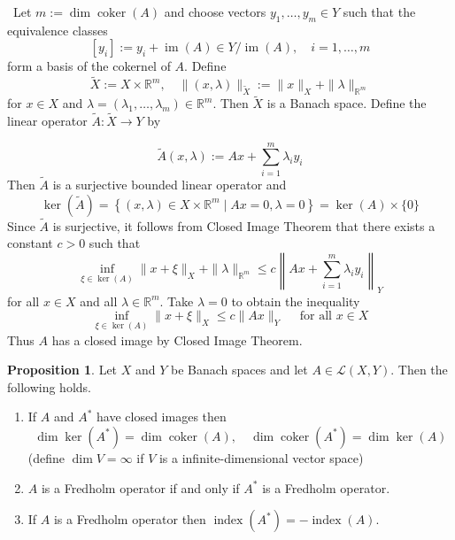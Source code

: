\documentclass[12pt,a4paper]{book}
\newenvironment{prooff}{{\noindent\it\textcolor{cyan!40!black}{Proof}:}\,}{\par}
\newenvironment{enu}{\begin{enumerate}[(1)]}{\end{enumerate}}
\theoremstyle{definition}
\newtheorem{prop}[defn]{Proposition}
\begin{document}
\begin{prooff}
    Let $m:=\operatorname{dim} \operatorname{coker}(A)$ and choose vectors $y_1, \ldots, y_m \in Y$ such that the equivalence classes
    $$
    \left[y_i\right]:=y_i+\operatorname{im}(A) \in Y / \operatorname{im}(A), \quad i=1, \ldots, m
    $$
    form a basis of the cokernel of $A$. Define
    $$
    \tilde{X}:=X \times \mathbb{R}^m, \quad\|(x, \lambda)\|_{\tilde{X}}:=\|x\|_X+\|\lambda\|_{\mathbb{R}^m}
    $$
    for $x \in X$ and $\lambda=\left(\lambda_1, \ldots, \lambda_m\right) \in \mathbb{R}^m$. Then $\tilde{X}$ is a Banach space. Define the linear operator $\widetilde{A}: \widetilde{X} \rightarrow Y$ by
    
    $$
    \widetilde{A}(x, \lambda):=A x+\sum_{i=1}^m \lambda_i y_i
    $$
    Then $\widetilde{A}$ is a surjective bounded linear operator and
    $$
    \operatorname{ker}(\widetilde{A})=\left\{(x, \lambda) \in X \times \mathbb{R}^m \mid A x=0, \lambda=0\right\}=\operatorname{ker}(A) \times\{0\}
    $$
    Since $\widetilde{A}$ is surjective, it follows from Closed Image Theorem 
    that there exists a constant $c>0$ such that
    $$
    \inf _{\xi \in \operatorname{ker}(A)}\|x+\xi\|_X+\|\lambda\|_{\mathbb{R}^m} \leq c\left\|A x+\sum_{i=1}^m \lambda_i y_i\right\|_Y
    $$
    for all $x \in X$ and all $\lambda \in \mathbb{R}^m$. Take $\lambda=0$ to obtain the inequality
    $$
    \inf _{\xi \in \operatorname{ker}(A)}\|x+\xi\|_X \leq c\|A x\|_Y \quad \text { for all } x \in X
    $$
    Thus $A$ has a closed image by Closed Image Theorem. 

\end{prooff}
\begin{prop}
    Let $X$ and $Y$ be Banach spaces and let $A \in \mathcal{L}(X, Y)$. Then the following holds.
\begin{enu} 
    \item If $A$ and $A^*$ have closed images then
    $$
    \operatorname{dim} \operatorname{ker}\left(A^*\right)=\operatorname{dim} \operatorname{coker}(A), \quad \operatorname{dim} \operatorname{coker}\left(A^*\right)=\operatorname{dim} \operatorname{ker}(A)
    $$
    (define $\dim V=\infty$ if $V$ is a infinite-dimensional vector space)
    \item $A$ is a Fredholm operator if and only if $A^*$ is a Fredholm operator.
    \item If $A$ is a Fredholm operator then $\operatorname{index}\left(A^*\right)=-\operatorname{index}(A)$.
\end{enu}

\end{prop}
\end{document}
